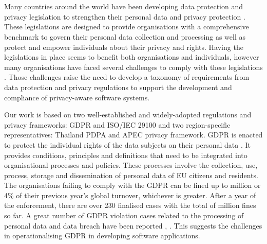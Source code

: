 \section{} \label{sec:theoretical-background}

Many countries around the world have been developing data protection and privacy legislation to strengthen their personal data and privacy protection \cite{UNCTAD2020}. These legislations are designed to provide organisations with a comprehensive benchmark to govern their personal data collection and processing as well as protect and empower individuals about their privacy and rights. Having the legislations in place seems to benefit both organisations and individuals, however many organisations have faced several challenges to comply with these legislations \cite{Capgemini2019}. Those challenges raise the need to develop a taxonomy of requirements from data protection and privacy regulations to support the development and compliance of privacy-aware software systems.


Our work is based on two well-established and widely-adopted regulations and privacy frameworks: GDPR and ISO/IEC 29100 and two region-specific representatives: Thailand PDPA and APEC privacy framework. GDPR is enacted to protect the individual rights of the data subjects on their personal data \cite{OfficeJournaloftheEuropeanUnion;2016}. It provides conditions, principles and definitions that need to be integrated into organisational processes and policies. These processes involve the collection, use, process, storage and dissemination of personal data of EU citizens and residents. The organisations failing to comply with the GDPR can be fined up to  million or 4\% of their previous year’s global turnover, whichever is greater. After a year of the enforcement, there are over 230 finalised cases with the total of  million fines so far. A great number of GDPR violation cases related to the processing of personal data and data breach have been reported \cite{EuropeanCommission2019}, \cite{PrivacyAffa}. This suggests the challenges in operationalising GDPR in developing software applications.

